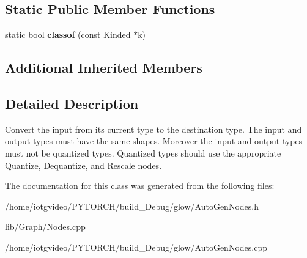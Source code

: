 \subsection*{Static Public Member Functions}
\begin{DoxyCompactItemize}
\item 
\mbox{\label{classglow_1_1_convert_to_node_a51f8f3a0fc1fbc5299378a58c119666e}} 
static bool {\bfseries classof} (const \hyperlink{classglow_1_1_kinded}{Kinded} $\ast$k)
\end{DoxyCompactItemize}
\subsection*{Additional Inherited Members}


\subsection{Detailed Description}
Convert the input from its current type to the destination type. The input and output types must have the same shapes. Moreover the input and output types must not be quantized types. Quantized types should use the appropriate Quantize, Dequantize, and Rescale nodes. 

The documentation for this class was generated from the following files\+:\begin{DoxyCompactItemize}
\item 
/home/iotgvideo/\+P\+Y\+T\+O\+R\+C\+H/build\+\_\+\+Debug/glow/Auto\+Gen\+Nodes.\+h\item 
lib/\+Graph/Nodes.\+cpp\item 
/home/iotgvideo/\+P\+Y\+T\+O\+R\+C\+H/build\+\_\+\+Debug/glow/Auto\+Gen\+Nodes.\+cpp\end{DoxyCompactItemize}
